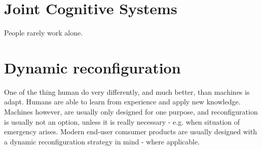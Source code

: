 \section{Joint Cognitive Systems}
\cite{hollnagel1983cognitive}
People rarely work alone.


\section{Dynamic reconfiguration}
One of the thing human do very differently, and much better, than machines is adapt. Humans are able to learn from experience and apply new knowledge. Machines however, are usually only designed for one purpose, and reconfiguration is usually not an option, unless it is really necessary - e.g. when situation of emergency arises.
Modern end-user comsumer products are usually designed with a dynamic reconfiguration strategy in mind - where applicable.

